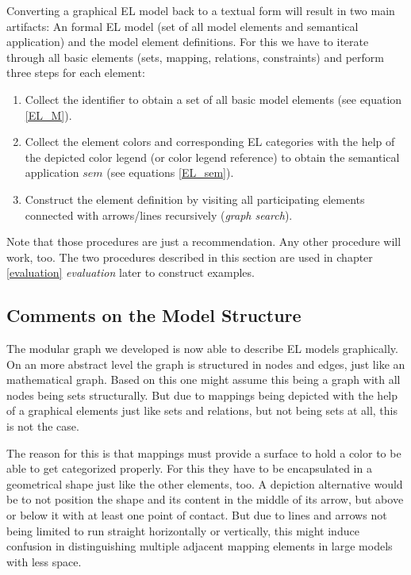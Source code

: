 \documentclass[twoside, openright, 12pt]{book}
\begin{document}
\noindent
Converting a graphical EL model back to a textual form will result in two main artifacts: An formal EL model (set of all model elements and semantical application) and the model element definitions.
For this we have to iterate through all basic elements (sets, mapping, relations, constraints) and perform three steps for each element:

\begin{enumerate}
\item Collect the identifier to obtain a set of all basic model elements (see equation \ref{EL_M}).

\item Collect the element colors and corresponding EL categories with the help of the depicted color legend (or color legend reference) to obtain the semantical application $\mathit{sem}$ (see equations \ref{EL_sem}).

\item Construct the element definition by visiting all participating elements connected with arrows/lines recursively (\textit{graph search}).
\end{enumerate}

\noindent
Note that those procedures are just a recommendation.
Any other procedure will work, too.
The two procedures described in this section are used in chapter \ref{evaluation} \textit{evaluation} later to construct examples.



\subsection{Comments on the Model Structure}
\label{comments_on_model_structure}
The modular graph we developed is now able to describe EL models graphically.
On an more abstract level the graph is structured in nodes and edges, just like an mathematical graph.
Based on this one might assume this being a graph with all nodes being sets structurally.
But due to mappings being depicted with the help of a graphical elements just like sets and relations, but not being sets at all, this is not the case.

The reason for this is that mappings must provide a surface to hold a color to be able to get categorized properly.
For this they have to be encapsulated in a geometrical shape just like the other elements, too.
A depiction alternative would be to not position the shape and its content in the middle of its arrow, but above or below it with at least one point of contact.
But due to lines and arrows not being limited to run straight horizontally or vertically, this might induce confusion in distinguishing multiple adjacent mapping elements in large models with less space.
\end{document}
